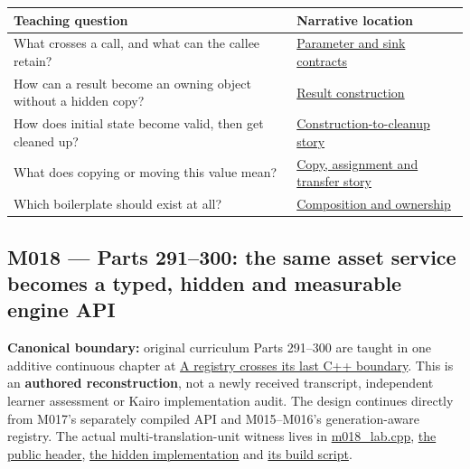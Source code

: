 {\def\LTcaptype{none} %
\begin{longtable}[]{@{}
  >{\raggedright\arraybackslash}p{}
  >{\raggedright\arraybackslash}p{}@{}}
\toprule\noalign{}
\begin{minipage}[b]{\linewidth}\raggedright
Teaching question
\end{minipage} & \begin{minipage}[b]{\linewidth}\raggedright
Narrative location
\end{minipage} \\
\midrule\noalign{}
\endhead
\bottomrule\noalign{}
\endlastfoot
What crosses a call, and what can the callee retain? & \hyperref[01-foundations-i-ch003-a-value-crosses-the-function-boundary]{Parameter and sink contracts} \\
How can a result become an owning object without a hidden copy? & \hyperref[01-foundations-i-ch003-return-a-result-without-handing-out-a-lifetime-problem]{Result construction} \\
How does initial state become valid, then get cleaned up? & \hyperref[01-foundations-i-ch003-construction-establishes-a-usable-state]{Construction-to-cleanup story} \\
What does copying or moving this value mean? & \hyperref[01-foundations-i-ch003-copy-a-meaning-rather-than-just-its-bytes]{Copy, assignment and transfer story} \\
Which boilerplate should exist at all? & \hyperref[01-foundations-i-ch003-from-three-repairs-to-five-decisions-to-zero-boilerplate]{Composition and ownership} \\
\end{longtable}
}

\subsection{M018 --- Parts 291--300: the same asset service becomes a typed, hidden and measurable engine API}\label{appendix-fd090d982a15-m018-parts-291300-the-same-asset-service-becomes-a-typed-hidden-and-measurable-engine-api}

\textbf{Canonical boundary:} original curriculum Parts 291--300 are taught in one additive continuous chapter at \hyperref[01-foundations-i-ch007-a-registry-crosses-its-last-c-boundary-hidden-implementation-typed-identity-and-measured-abstraction-cost]{A registry crosses its last C++ boundary}. This is an \textbf{authored reconstruction}, not a newly received transcript, independent learner assessment or Kairo implementation audit. The design continues directly from M017's separately compiled API and M015--M016's generation-aware registry. The actual multi-translation-unit witness lives in \hyperref[source-file-8aedc3fdcd10c91971507448]{m018\_lab.cpp}, \hyperref[source-file-0529c78555b675a2ae111228]{the public header}, \hyperref[source-file-04abded74b7e03edc5dcf870]{the hidden implementation} and \hyperref[source-file-c936569afa19be638ec87991]{its build script}.

